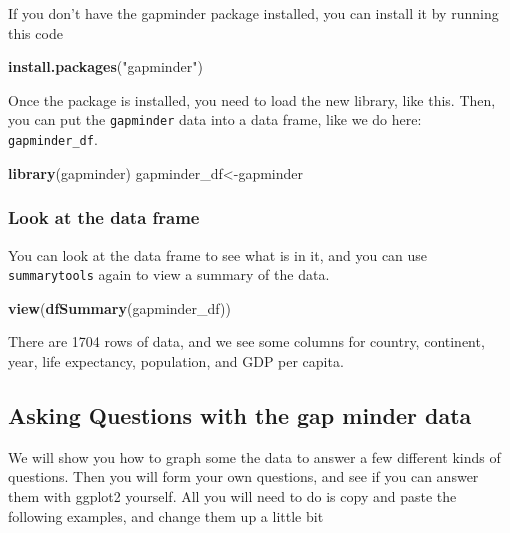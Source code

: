 \documentclass[]{book}
\newenvironment{Shaded}{\begin{snugshade}}{\end{snugshade}}
\newcommand{\KeywordTok}[1]{\textcolor[rgb]{0.13,0.29,0.53}{\textbf{{#1}}}}
\newcommand{\StringTok}[1]{\textcolor[rgb]{0.31,0.60,0.02}{{#1}}}
\newcommand{\NormalTok}[1]{{#1}}
\theoremstyle{definition}
\theoremstyle{definition}
\theoremstyle{definition}
\theoremstyle{remark}
\begin{document}
If you don't have the gapminder package installed, you can install it by
running this code

\begin{Shaded}
\begin{Highlighting}[]
\KeywordTok{install.packages}\NormalTok{(}\StringTok{"gapminder"}\NormalTok{)}
\end{Highlighting}
\end{Shaded}

Once the package is installed, you need to load the new library, like
this. Then, you can put the \texttt{gapminder} data into a data frame,
like we do here: \texttt{gapminder\_df}.

\begin{Shaded}
\begin{Highlighting}[]
\KeywordTok{library}\NormalTok{(gapminder)}
\NormalTok{gapminder_df<-gapminder}
\end{Highlighting}
\end{Shaded}

\subsubsection{Look at the data frame}\label{look-at-the-data-frame}

You can look at the data frame to see what is in it, and you can use
\texttt{summarytools} again to view a summary of the data.

\begin{Shaded}
\begin{Highlighting}[]
\KeywordTok{view}\NormalTok{(}\KeywordTok{dfSummary}\NormalTok{(gapminder_df))}
\end{Highlighting}
\end{Shaded}

There are 1704 rows of data, and we see some columns for country,
continent, year, life expectancy, population, and GDP per capita.

\subsection{Asking Questions with the gap minder
data}\label{asking-questions-with-the-gap-minder-data}

We will show you how to graph some the data to answer a few different
kinds of questions. Then you will form your own questions, and see if
you can answer them with ggplot2 yourself. All you will need to do is
copy and paste the following examples, and change them up a little bit
\end{document}
